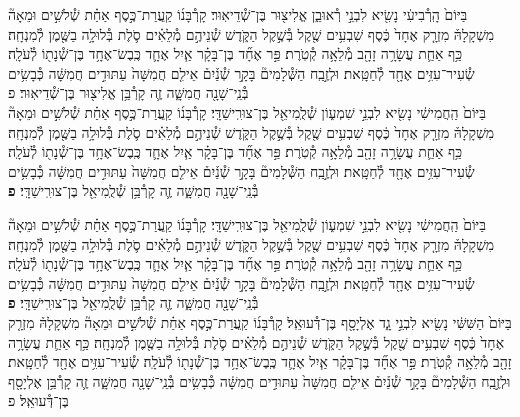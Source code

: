 \documentclass[twoside, openany, parskip=half, 11pt]{book}
\begin{document}
\begin{footnotesize}
\begin{multicols}{2}

בַּיּוֹם֙ הָֽרְ֯בִיעִ֔י נָשִׂ֖יא לִבְנֵ֣י רְ֯אוּבֵ֑ן אֱלִיצ֖וּר בֶּן־שְׁ֯דֵיאֽוּר׃ קָרְ֯בָּנ֜וֹ קַֽעֲרַת־כֶּ֣סֶף אַחַ֗ת שְׁ֯לֹשִׁ֣ים וּמֵאָה֘ מִשְׁקָלָהּ֒ מִזְרָ֤ק אֶחָד֙ כֶּ֔סֶף שִׁבְעִ֥ים שֶׁ֖קֶל בְּ֯שֶׁ֣קֶל הַקֹּ֑דֶשׁ שְׁ֯נֵיהֶ֣ם מְ֯לֵאִ֗ים סֹ֛לֶת בְּ֯לוּלָ֥ה בַשֶּׁ֖מֶן לְ֯מִנְחָֽה׃ כַּ֥ף אַחַ֛ת עֲשָׂרָ֥ה זָהָ֖ב מְ֯לֵאָ֥ה קְ֯טֹֽרֶת׃  פַּ֣ר אֶחָ֞ד בֶּן־בָּקָ֗ר אַ֧יִל אֶחָ֛ד כֶּֽבֶשׂ־אֶחָ֥ד בֶּן־שְׁ֯נָת֖וֹ לְ֯עֹלָֽה׃ שְׂ֯עִיר־עִזִּ֥ים אֶחָ֖ד לְ֯חַטָּֽאת׃ וּלְזֶ֣בַֽח הַשְּׁ֯לָמִים֘ בָּקָ֣ר שְׁ֯נַ֒יִם֒ אֵילִ֤ם חֲמִשָּׁה֙ עַתּוּדִ֣ים חֲמִשָּׁ֔ה כְּ֯בָשִׂ֥ים בְּ֯נֵֽי־שָׁנָ֖ה חֲמִשָּׁ֑ה זֶ֛ה קָרְ֯בַּ֥ן אֱלִיצ֖וּר בֶּן־שְׁ֯דֵיאֽוּר׃ פ\\
 בַּיּוֹם֙ הַֽחֲמִישִׁ֔י נָשִׂ֖יא לִבְנֵ֣י שִׁמְע֑וֹן שְׁ֯לֻֽמִיאֵ֖ל בֶּן־צוּרִֽישַׁדָּֽי׃ קָרְ֯בָּנ֜וֹ קַֽעֲרַת־כֶּ֣סֶף אַחַ֗ת שְׁ֯לֹשִׁ֣ים וּמֵאָה֘ מִשְׁקָלָהּ֒ מִזְרָ֤ק אֶחָד֙ כֶּ֔סֶף שִׁבְעִ֥ים שֶׁ֖קֶל בְּ֯שֶׁ֣קֶל הַקֹּ֑דֶשׁ שְׁ֯נֵיהֶ֣ם מְ֯לֵאִ֗ים סֹ֛לֶת בְּ֯לוּלָ֥ה בַשֶּׁ֖מֶן לְ֯מִנְחָֽה׃ כַּ֥ף אַחַ֛ת עֲשָׂרָ֥ה זָהָ֖ב מְ֯לֵאָ֥ה קְ֯טֹֽרֶת׃ פַּ֣ר אֶחָ֞ד בֶּן־בָּקָ֗ר אַ֧יִל אֶחָ֛ד כֶּֽבֶשׂ־אֶחָ֥ד בֶּן־שְׁ֯נָת֖וֹ לְ֯עֹלָֽה׃ שְׂ֯עִיר־עִזִּ֥ים אֶחָ֖ד לְ֯חַטָּֽאת׃ וּלְזֶ֣בַֽח הַשְּׁ֯לָמִים֘ בָּקָ֣ר שְׁ֯נַ֒יִם֒ אֵילִ֤ם חֲמִשָּׁה֙ עַתּוּדִ֣ים חֲמִשָּׁ֔ה כְּ֯בָשִׂ֥ים בְּ֯נֵֽי־שָׁנָ֖ה חֲמִשָּׁ֑ה זֶ֛ה קָרְ֯בַּ֥ן שְׁ֯לֻֽמִיאֵ֖ל בֶּן־צוּרִֽישַׁדָּֽי׃ \textbf{פ}

\vfill\null
\columnbreak


בַּיּוֹם֙ הַֽחֲמִישִׁ֔י נָשִׂ֖יא לִבְנֵ֣י שִׁמְע֑וֹן שְׁ֯לֻֽמִיאֵ֖ל בֶּן־צוּרִֽישַׁדָּֽי׃ קָרְ֯בָּנ֜וֹ קַֽעֲרַת־כֶּ֣סֶף אַחַ֗ת שְׁ֯לֹשִׁ֣ים וּמֵאָה֘ מִשְׁקָלָהּ֒ מִזְרָ֤ק אֶחָד֙ כֶּ֔סֶף שִׁבְעִ֥ים שֶׁ֖קֶל בְּ֯שֶׁ֣קֶל הַקֹּ֑דֶשׁ שְׁ֯נֵיהֶ֣ם מְ֯לֵאִ֗ים סֹ֛לֶת בְּ֯לוּלָ֥ה בַשֶּׁ֖מֶן לְ֯מִנְחָֽה׃ כַּ֥ף אַחַ֛ת עֲשָׂרָ֥ה זָהָ֖ב מְ֯לֵאָ֥ה קְ֯טֹֽרֶת׃  פַּ֣ר אֶחָ֞ד בֶּן־בָּקָ֗ר אַ֧יִל אֶחָ֛ד כֶּֽבֶשׂ־אֶחָ֥ד בֶּן־שְׁ֯נָת֖וֹ לְ֯עֹלָֽה׃ שְׂ֯עִיר־עִזִּ֥ים אֶחָ֖ד לְ֯חַטָּֽאת׃ וּלְזֶ֣בַֽח הַשְּׁ֯לָמִים֘ בָּקָ֣ר שְׁ֯נַ֒יִם֒ אֵילִ֤ם חֲמִשָּׁה֙ עַתּוּדִ֣ים חֲמִשָּׁ֔ה כְּ֯בָשִׂ֥ים בְּ֯נֵֽי־שָׁנָ֖ה חֲמִשָּׁ֑ה זֶ֛ה קָרְ֯בַּ֥ן שְׁ֯לֻֽמִיאֵ֖ל בֶּן־צוּרִֽישַׁדָּֽי׃ \textbf{פ} \\
 בַּיּוֹם֙ הַשִּׁשִּׁ֔י נָשִׂ֖יא לִבְנֵ֣י גָ֑ד אֶלְיָסָ֖ף בֶּן־דְּ֯עוּאֵֽל׃ קָרְ֯בָּנ֜וֹ קַֽעֲרַת־כֶּ֣סֶף אַחַ֗ת שְׁ֯לֹשִׁ֣ים וּמֵאָה֘ מִשְׁקָלָהּ֒ מִזְרָ֤ק אֶחָד֙ כֶּ֔סֶף שִׁבְעִ֥ים שֶׁ֖קֶל בְּ֯שֶׁ֣קֶל הַקֹּ֑דֶשׁ שְׁ֯נֵיהֶ֣ם מְ֯לֵאִ֗ים סֹ֛לֶת בְּ֯לוּלָ֥ה בַשֶּׁ֖מֶן לְ֯מִנְחָֽה׃ כַּ֥ף אַחַ֛ת עֲשָׂרָ֥ה זָהָ֖ב מְ֯לֵאָ֥ה קְ֯טֹֽרֶת׃ פַּ֣ר אֶחָ֞ד בֶּן־בָּקָ֗ר אַ֧יִל אֶחָ֛ד כֶּֽבֶשׂ־אֶחָ֥ד בֶּן־שְׁ֯נָת֖וֹ לְ֯עֹלָֽה׃ שְׂ֯עִיר־עִזִּ֥ים אֶחָ֖ד לְ֯חַטָּֽאת׃ וּלְזֶ֣בַֽח הַשְּׁ֯לָמִים֘ בָּקָ֣ר שְׁ֯נַ֒יִם֒ אֵילִ֤ם חֲמִשָּׁה֙ עַתּוּדִ֣ים חֲמִשָּׁ֔ה כְּ֯בָשִׂ֥ים בְּ֯נֵֽי־שָׁנָ֖ה חֲמִשָּׁ֑ה זֶ֛ה קָרְ֯בַּ֥ן אֶלְיָסָ֖ף בֶּן־דְּ֯עוּאֵֽל׃ פ


\end{multicols}
\end{footnotesize}
\end{document}
